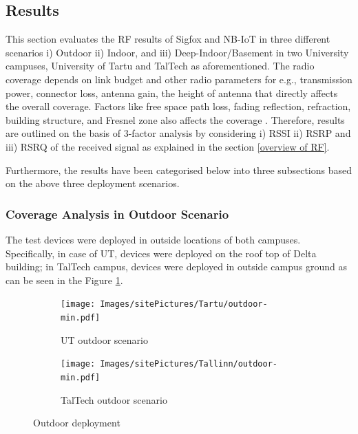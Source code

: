 \documentclass[12pt]{article}
\begin{document}
\subsection{Results}\label{results}
This section evaluates the RF results of Sigfox and NB-IoT in three different scenarios i) Outdoor ii) Indoor, and iii) Deep-Indoor/Basement in two University campuses, University of Tartu and TalTech as aforementioned. The radio coverage depends on link budget and other radio parameters for e.g., transmission power, connector loss, antenna gain, the height of antenna that directly affects the overall coverage. Factors like free space path loss, fading reflection, refraction, building structure, and Fresnel zone also affects the coverage \cite{sikora2019test,sikora2019performance}. Therefore, results are outlined on the basis of 3-factor analysis by considering i) RSSI ii) RSRP and iii) RSRQ of the received signal as explained in the section \ref{overview of RF}.\par

Furthermore, the results have been categorised below into three subsections based on the above three deployment scenarios.

\subsubsection{Coverage Analysis in Outdoor Scenario}\label{Outdoor Analysis}

The test devices were deployed in outside locations of both campuses. Specifically, in case of UT, devices were deployed on the roof top of Delta building; in TalTech campus, devices were deployed in outside campus ground as can be seen in the Figure \ref{fig:Outdoor deployment}.\par



\begin{figure}[H]
\centering
\begin{subfigure}[t]{0.42\linewidth}
  \centering
   \texttt{[image: Images/sitePictures/Tartu/outdoor-min.pdf]} 
  \caption{UT outdoor scenario}
\end{subfigure}
\begin{subfigure}[t]{0.42\linewidth}
  \centering
  \texttt{[image: Images/sitePictures/Tallinn/outdoor-min.pdf]} 
  \caption{TalTech outdoor scenario}
\end{subfigure}

\caption{Outdoor deployment}
 \label{fig:Outdoor deployment}
\end{figure}
\end{document}
